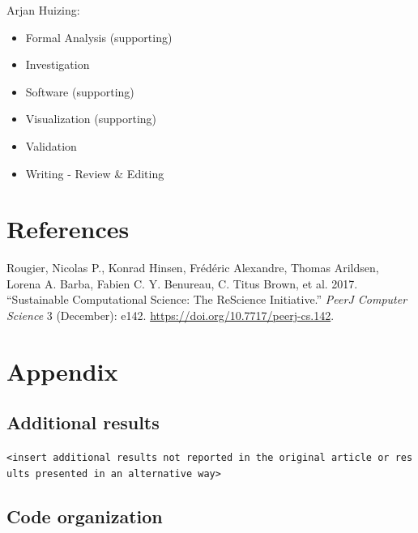 \documentclass[10,a4paperpaper,]{article}
\newenvironment{CSLReferences}%
  {}%
  {\par}
\begin{document}
Arjan Huizing:

\begin{itemize}
\tightlist
\item
  Formal Analysis (supporting)\\
\item
  Investigation\\
\item
  Software (supporting)\\
\item
  Visualization (supporting)\\
\item
  Validation\\
\item
  Writing - Review \& Editing
\end{itemize}

\newpage

\section*{References}
\begingroup
\hphantom{x}
\setlength{\parindent}{-0.5in}
\setlength{\leftskip}{0.5in}

\hypertarget{refs}{}
\begin{CSLReferences}{1}{0}
\leavevmode{}%
Rougier, Nicolas P., Konrad Hinsen, Frédéric Alexandre, Thomas Arildsen,
Lorena A. Barba, Fabien C. Y. Benureau, C. Titus Brown, et al. 2017.
{``Sustainable Computational Science: The {ReScience} Initiative.''}
\emph{PeerJ Computer Science} 3 (December): e142.
\url{https://doi.org/10.7717/peerj-cs.142}.

\end{CSLReferences}

\FloatBarrier
\endgroup
\newpage

\section*{Appendix}

\subsection*{Additional results}

\texttt{\textless{}insert\ additional\ results\ not\ reported\ in\ the\ original\ article\ or\ results\ presented\ in\ an\ alternative\ way\textgreater{}}

\subsection{Code organization}
\end{document}
